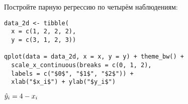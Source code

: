 \begin{problem}
Постройте парную регрессию по четырём наблюдениям:

\begin{verbatim}
data_2d <- tibble(
  x = c(1, 2, 2, 2),
  y = c(3, 1, 2, 3))

qplot(data = data_2d, x = x, y = y) + theme_bw() +
  scale_x_continuous(breaks = c(0, 1, 2),
  labels = c("$0$", "$1$", "$2$")) +
  xlab("$x_i$") + ylab("$y_i$")
\end{verbatim}


\begin{minipage}{\textwidth}
\begin{tikzpicture}[scale = 0.025]

\end{tikzpicture}
\end{minipage}


\begin{sol}
$\hy_i = 4 - x_i$
\end{sol}
\end{problem}


